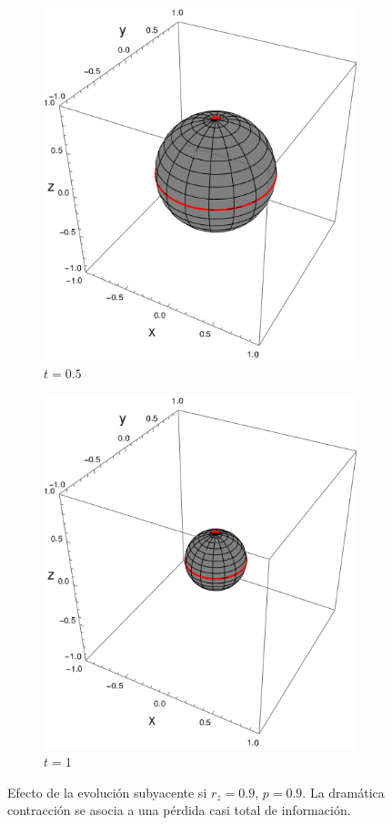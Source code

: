 \begin{figure}[h!]
\begin{subfigure}{0.32\textwidth}
    \includegraphics[width=0.9\linewidth]{maxent/figures/sphere_swapcontraction_t=0.5_z=0.9_p=0.9.png}
    \caption{$t=0.5$}
  \end{subfigure}
  \begin{subfigure}{0.32\textwidth}
    \centering
    \includegraphics[width=0.9\linewidth]{maxent/figures/sphere_swapcontraction_t=1.0_z=0.9_p=0.9.png}
    \caption{$t=1$}
  \end{subfigure}
  \caption{Efecto de la evolución subyacente si $r_{z}=0.9$, $p=0.9$. La dramática contracción se asocia a una pérdida casi total de información.}
  \label{fig:SWAPFactorSequence}
  \end{figure}
